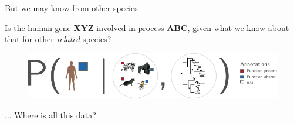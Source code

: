\documentclass[aspectratio=169, 9pt]{beamer}
\begin{document}
\begin{frame}[c]
{\begin{minipage}[t]{.33\linewidth}
		But we may know from other species
	\end{minipage}}\hfill
	\hfill
	
\bigskip{}

\end{frame}

\begin{frame}[c,label=aphylo-prob-diagram]
	\begin{center}
		\normalsize Is the human gene \textbf{XYZ} involved in process \textbf{ABC}, \uline{given what we know about that for other \textit{related} species}?
	\end{center}
	
	\begin{figure}
		\includegraphics[width=.9\linewidth]{aphylo-data-probability.pdf}
	\end{figure}\pause
	\Large \bigskip\hfill... Where is all this data?\normalsize


\vfill\hfill\hyperlink{aphylographicalview}{}

\end{frame}
\end{document}
